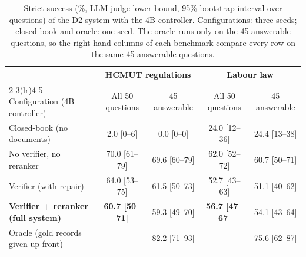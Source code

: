\begin{table}[!htbp]\tabstyle
\begin{tabular}{@{}lcccc@{}}
\toprule & \multicolumn{2}{c}{HCMUT regulations} & \multicolumn{2}{c}{Labour law}\\\cmidrule(lr){2-3}\cmidrule(lr){4-5}
Configuration (4B controller) & All 50 questions & 45 answerable & All 50 questions & 45 answerable\\\midrule
Closed-book (no documents) & 2.0 [0--6] & 0.0 [0--0] & 24.0 [12--36] & 24.4 [13--38]\\
No verifier, no reranker & 70.0 [61--79] & 69.6 [60--79] & 62.0 [52--72] & 60.7 [50--71]\\
Verifier (with repair) & 64.0 [53--75] & 61.5 [50--73] & 52.7 [43--63] & 51.1 [40--62]\\
\textbf{Verifier + reranker (full system)} & \textbf{60.7 [50--71]} & 59.3 [49--70] & \textbf{56.7 [47--67]} & 54.1 [43--64]\\
Oracle (gold records given up front) & -- & 82.2 [71--93] & -- & 75.6 [62--87]\\
\bottomrule\end{tabular}
\caption{Strict success (\%, LLM-judge lower bound, 95\% bootstrap interval over questions) of the D2 system with the 4B controller. Configurations: three seeds; closed-book and oracle: one seed. The oracle runs only on the 45 answerable questions, so the right-hand columns of each benchmark compare every row on the same 45 answerable questions.}\label{tab:main}
\end{table}
